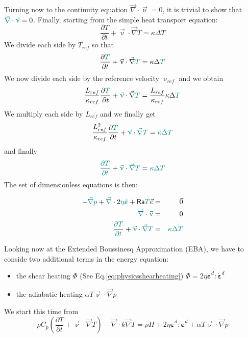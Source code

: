 Turning now to the continuity equation $\vec\nabla \cdot\vec\upnu = 0$,
it is trivial to show that  ${\color{teal} \vec\nabla } \cdot  {\color{teal}\vec\upnu} = 0$.
Finally, starting from the simple heat transport equation:
\[
\frac{\partial T}{\partial t} + \vec\upnu\cdot\vec\nabla T = \kappa \Delta T
\]
We divide each side by $T_{ref}$ so that 
\[
\frac{\partial {\color{teal}T}}{\partial t} + \vec\upnu\cdot\vec\nabla {\color{teal}T} = \kappa \Delta {\color{teal}T}
\]
We now divide each side by the reference velocity $\upnu_{ref}$ 
and we obtain
\[
\frac{L_{ref}}{\kappa_{ref}} \frac{\partial {\color{teal}T}}{\partial t} 
+ {\color{teal} \vec\upnu} \cdot\vec\nabla {\color{teal}T} 
=  \frac{L_{ref}}{\kappa_{ref}}  \kappa \Delta {\color{teal}T}
\]
We multiply each side by $L_{ref}$ and we finally get
\[
\frac{L_{ref}^2}{\kappa_{ref}} 
\frac{\partial {\color{teal}T}}{\partial t}
+ {\color{teal} \vec\upnu} \cdot  {\color{teal}\vec\nabla} {\color{teal}T} =  {\color{teal} \kappa} {\color{teal}\Delta} {\color{teal}T}
\]
and finally
\[
\frac{ {\color{teal} \partial T}}{ {\color{teal} \partial t}} 
+ {\color{teal} \vec\upnu} \cdot  {\color{teal}\vec\nabla} {\color{teal}T} =  {\color{teal} \kappa} {\color{teal}\Delta} {\color{teal}T}
\]
The set of dimensionless equations is then:

\begin{mdframed}[backgroundcolor=blue!5]
\begin{eqnarray}
-{\color{teal} \vec\nabla} {\color{teal}p} + {\color{teal} \vec\nabla} \cdot 2  {\color{teal}\eta \dot{\bm\varepsilon}}
+ {\mathsf{Ra}}  {\color{teal} T} \vec{e} &=& \vec{0} \label{eq:adimmm1}\\
{\color{teal} \vec\nabla } \cdot  {\color{teal}\vec\upnu} &=& 0 \label{eq:adimmm2}\\
\frac{ {\color{teal} \partial T}}{ {\color{teal} \partial t}} 
+ {\color{teal} \vec\upnu} \cdot  {\color{teal}\vec\nabla} {\color{teal}T} 
&=&  {\color{teal} \kappa} {\color{teal}\Delta} {\color{teal}T} \label{eq:adimmm3}
\end{eqnarray}
\end{mdframed}

Looking now at the Extended Boussinesq Approximation (EBA), we have to conside two additional terms in the 
energy equation:
\begin{itemize}
\item the shear heating $\Phi$ (See Eq.\eqref{eq:physicsshearheating}) 
$\Phi = 2 \eta  \dot{\bm \varepsilon}^d : \dot{\bm \varepsilon}^d$ 
\item the adiabatic heating $\alpha T \vec\upnu\cdot\vec\nabla p$
\end{itemize}
We start this time from 
\[
\rho C_p \left(\frac{\partial T}{\partial t} + \vec \upnu\cdot\vec\nabla T\right)
- \vec\nabla\cdot k\vec\nabla T 
= \rho H + 2\eta\dot{\bm \varepsilon}^d : \dot{\bm \varepsilon}^d 
+\alpha T  \vec\upnu \cdot \vec\nabla p 
\]

